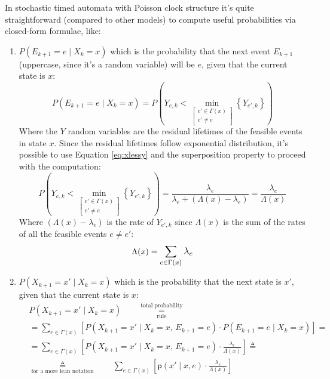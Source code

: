\documentclass[12pt,a4paper]{article}
\newcommand*{\transp}{\mathsf{p}}
\begin{document}
\bigskip
\noindent
In stochastic timed automata with Poisson clock structure it's quite straightforward (compared to other models) to compute useful probabilities via closed-form formulae, like:
\begin{enumerate}
\item $P(E_{k+1}=e \mid X_k=x)$ which is the probability that the next event $E_{k+1}$ (uppercase, since it's a random variable) will be $e$, given that the current state is $x$:
$$
P(E_{k+1}=e \mid X_k=x)=P\left(Y_{e,k} <
\min_{\left[
\begin{matrix}
e'\in \Gamma(x) \\
e'\neq e
\end{matrix}
\right]}
\left\lbrace Y_{e',k}\right\rbrace \right)
$$
Where the $Y$ random variables are the residual lifetimes of the feasible events in state $x$. Since the residual lifetimes follow exponential distribution, it's possible to use Equation \ref{eq:xlessy} and the superposition property to proceed with the computation:
\begin{equation}
\label{eq:inxnextstateise}
P\left(Y_{e,k} <
\min_{\left[
\begin{matrix}
e'\in \Gamma(x) \\
e'\neq e
\end{matrix}
\right]}
\left\lbrace Y_{e',k}\right\rbrace \right)
=\frac{\lambda_e}{\lambda_e+(\Lambda(x)-\lambda_e)}=\frac{\lambda_e}{\Lambda(x)}
\end{equation}
\noindent
Where $(\Lambda(x)-\lambda_e)$ is the rate of $Y_{e',k}$ since $\Lambda(x)$ is the sum of the rates of all the feasible events $e \neq e'$:
$$
\Lambda(x) = \mathlarger{\sum_{e \in \Gamma(x)}\lambda_e}
$$
\newpage
\item $P(X_{k+1}=x' \mid X_k=x)$ which is the probability that the next state is $x'$, given that the current state is $x$:
\begin{align*}
&P(X_{k+1}=x' \mid X_k=x) \qquad\underset{\textrm{rule}}{\overset{\textrm{total probability}}{=}}
\\
&=\sum_{e\in \Gamma(x)}{
\left[
P\left(
X_{k+1}=x' \mid X_k=x\textrm{, }E_{k+1}=e
\right)\cdot
P\left(
E_{k+1}=e \mid X_k=x
\right)
\right]
}=
\\
&=
\sum_{e\in \Gamma(x)}{
\left[
P\left(
X_{k+1}=x' \mid X_k=x\textrm{, }E_{k+1}=e
\right)\cdot
\frac{\lambda_e}{\Lambda(x)}
\right]}\triangleq
\\
&\underset{\textrm{for a more lean notation}}{\triangleq}
\qquad
\sum_{e\in \Gamma(x)}{
\left[
\transp\left(x' \mid x,e
\right)\cdot
\frac{\lambda_e}{\Lambda(x)}
\right]}
\end{align*}
\end{enumerate}
\end{document}
